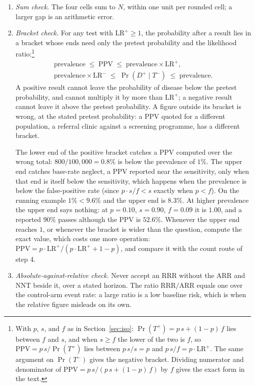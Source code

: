 \documentclass[11pt]{article}
\begin{document}
\begin{enumerate}[leftmargin=2em,itemsep=0.4em]
  \begin{enumerate}[label=(\alph*),leftmargin=2em,itemsep=0.2em]
    \item \emph{Sum check.} The four cells sum to $N$, within one unit per rounded cell; a larger gap is an arithmetic error.
    \item \emph{Bracket check.} For any test with $\mathrm{LR}^+ \geq 1$, the probability after a result lies in a bracket whose ends need only the pretest probability and the likelihood ratio:\footnote{With $p$, $s$, and $f$ as in Section~\ref{sec:iso}: $\Pr(T^+) = p\,s + (1-p)\,f$ lies between $f$ and $s$, and when $s \geq f$ the lower of the two is $f$, so $\mathrm{PPV} = p\,s / \Pr(T^+)$ lies between $p\,s / s = p$ and $p\,s / f = p \cdot \mathrm{LR}^+$. The same argument on $\Pr(T^-)$ gives the negative bracket. Dividing numerator and denominator of $\mathrm{PPV} = p\,s / (p\,s + (1-p)\,f)$ by $f$ gives the exact form in the text.}
    \begin{gather*}
      \text{prevalence} \;\leq\; \mathrm{PPV} \;\leq\; \text{prevalence} \times \mathrm{LR}^+, \\
      \text{prevalence} \times \mathrm{LR}^- \;\leq\; \Pr(D^+ \mid T^-) \;\leq\; \text{prevalence}.
    \end{gather*}
    A positive result cannot leave the probability of disease below the pretest probability, and cannot multiply it by more than $\mathrm{LR}^+$; a negative result cannot leave it above the pretest probability. A figure outside its bracket is wrong, at the stated pretest probability: a PPV quoted for a different population, a referral clinic against a screening programme, has a different bracket.

    The lower end of the positive bracket catches a PPV computed over the wrong total: $800 / 100{,}000 = 0.8\%$ is below the prevalence of $1\%$. The upper end catches base-rate neglect, a PPV reported near the sensitivity, only when that end is itself below the sensitivity, which happens when the prevalence is below the false-positive rate (since $p \cdot s / f < s$ exactly when $p < f$). On the running example $1\% < 9.6\%$ and the upper end is $8.3\%$. At higher prevalence the upper end says nothing: at $p = 0.10$, $s = 0.90$, $f = 0.09$ it is $1.00$, and a reported $90\%$ passes although the PPV is $52.6\%$. Whenever the upper end reaches $1$, or whenever the bracket is wider than the question, compute the exact value, which costs one more operation: $\mathrm{PPV} = p \cdot \mathrm{LR}^+ / (p \cdot \mathrm{LR}^+ + 1 - p)$, and compare it with the count route of step 4.
    \item \emph{Absolute-against-relative check.} Never accept an RRR without the ARR and NNT beside it, over a stated horizon. The ratio $\mathrm{RRR}/\mathrm{ARR}$ equals one over the control-arm event rate: a large ratio is a low baseline risk, which is when the relative figure misleads on its own.
  \end{enumerate}
\end{enumerate}
\end{document}
